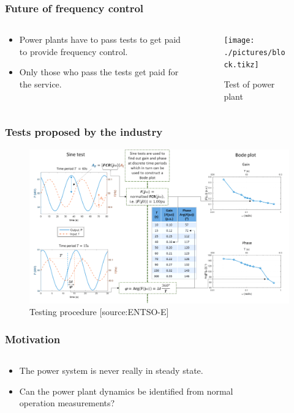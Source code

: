 \begin{frame}
	\frametitle{Future of frequency control}
	\begin{columns}
		\begin{column}{0.4\textwidth}
			\begin{itemize}
				\item Power plants have to pass tests to get paid to provide frequency control.
				\item Only those who pass the tests get paid for the service.
			\end{itemize}
		\end{column}
	\begin{column}{0.6\textwidth}
		\begin{figure}
			\texttt{[image: ./pictures/block.tikz]}
			\caption{Test of power plant}
		\end{figure}
	\end{column}
\end{columns}
\end{frame}
\begin{frame}
	\frametitle{Tests proposed by the industry}
	\begin{figure}
		\includegraphics[width=\textwidth]{./pictures/tests.png}
		\caption{Testing procedure [source:ENTSO-E]}
	\end{figure}
\end{frame}
\begin{frame}
		\frametitle{Motivation}
		\begin{columns}
				\begin{column}{0.5\textwidth}
						\begin{itemize}
								\item<1-> The power system is never really in steady state.
								\item<2-> Can the power plant dynamics be identified from normal operation measurements?
						\end{itemize}
			\end{column}
			\begin{column}{0.5\textwidth}
						\begin{figure}
						\includegraphics<1->[width=\textwidth]{./pictures/aura_pmu.tikz}
				\end{figure}
				\end{column}
		\end{columns}
\end{frame}
